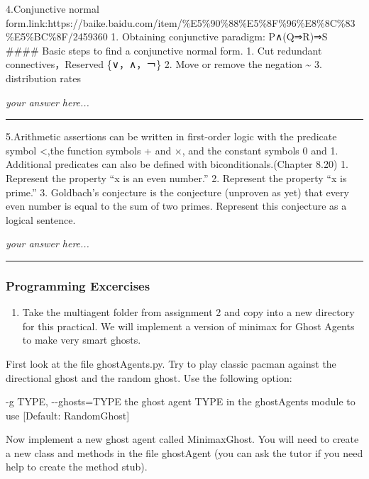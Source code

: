 \documentclass[11pt]{article}
\providecommand{\tightlist}{%
      \setlength{\itemsep}{0pt}\setlength{\parskip}{0pt}}
\begin{document}
    4.Conjunctive normal
form.link:https://baike.baidu.com/item/\%E5\%90\%88\%E5\%8F\%96\%E8\%8C\%83\%E5\%BC\%8F/2459360
1. Obtaining conjunctive paradigm: P∧(Q⇒R)⇒S \#\#\#\# Basic steps to
find a conjunctive normal form. 1. Cut redundant connectives，Reserved
\{∨，∧，￢\} 2. Move or remove the negation \textasciitilde{} 3.
distribution rates

    \emph{your answer here...}

\begin{center}\rule{0.5\linewidth}{\linethickness}\end{center}

    5.Arithmetic assertions can be written in first-order logic with the
predicate symbol \textless{},the function symbols + and ×, and the
constant symbols 0 and 1. Additional predicates can also be defined with
biconditionals.(Chapter 8.20) 1. Represent the property ``x is an even
number.'' 2. Represent the property ``x is prime.'' 3. Goldbach's
conjecture is the conjecture (unproven as yet) that every even number is
equal to the sum of two primes. Represent this conjecture as a logical
sentence.

    \emph{your answer here...}

\begin{center}\rule{0.5\linewidth}{\linethickness}\end{center}

    \subsubsection{Programming Excercises}\label{programming-excercises}

    \begin{enumerate}
\def\labelenumi{\arabic{enumi}.}
\tightlist
\item
  Take the multiagent folder from assignment 2 and copy into a new
  directory for this practical. We will implement a version of minimax
  for Ghost Agents to make very smart ghosts.
\end{enumerate}

First look at the file ghostAgents.py. Try to play classic pacman
against the directional ghost and the random ghost. Use the following
option:

-g TYPE, -\/-ghosts=TYPE the ghost agent TYPE in the ghostAgents module
to use {[}Default: RandomGhost{]}

Now implement a new ghost agent called MinimaxGhost. You will need to
create a new class and methods in the file ghostAgent (you can ask the
tutor if you need help to create the method stub).
\end{document}
